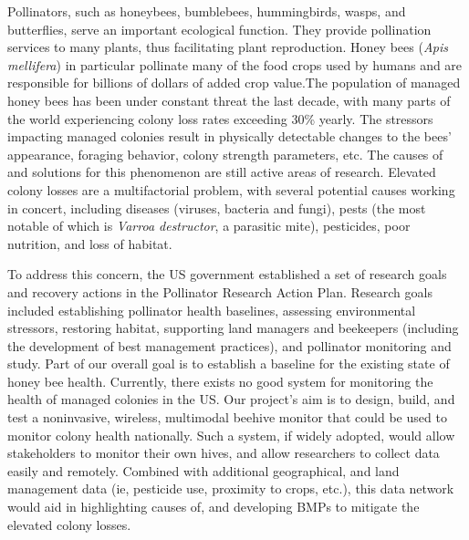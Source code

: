 


Pollinators, such as honeybees, bumblebees, hummingbirds, wasps, and butterflies, serve an important ecological function. They provide pollination services to many plants, thus facilitating plant reproduction. Honey bees (\textit{Apis mellifera}) in particular pollinate many of the food crops used by humans and are responsible for billions of dollars of added crop value.The population of managed honey bees has been under constant threat the last decade, with many parts of the world experiencing colony loss rates exceeding 30\% yearly. The stressors impacting managed colonies result in physically detectable changes to the bees’ appearance, foraging behavior, colony strength parameters, etc. The causes of and solutions for this phenomenon are still active areas of research. Elevated colony losses are a multifactorial problem, with several potential causes working in concert, including diseases (viruses, bacteria and fungi), pests (the most notable of which is \textit{Varroa destructor}, a parasitic mite), pesticides, poor nutrition, and loss of habitat.

To address this concern, the US government established a set of research goals and recovery actions in the Pollinator Research Action Plan. Research goals included establishing pollinator health baselines, assessing environmental stressors, restoring habitat, supporting land managers and beekeepers (including the development of best management practices), and pollinator monitoring and study. Part of our overall goal is to establish a baseline for the existing state of honey bee health. Currently, there exists no good system for monitoring the health of managed colonies in the US. Our project’s aim is to design, build, and test a noninvasive, wireless, multimodal beehive monitor that could be used to monitor colony health nationally. Such a system, if widely adopted, would allow stakeholders to monitor their own hives, and allow researchers to collect data easily and remotely. Combined with additional geographical, and land management data (ie, pesticide use, proximity to crops, etc.), this data network would aid in highlighting causes of, and developing BMPs to mitigate the elevated colony losses.

